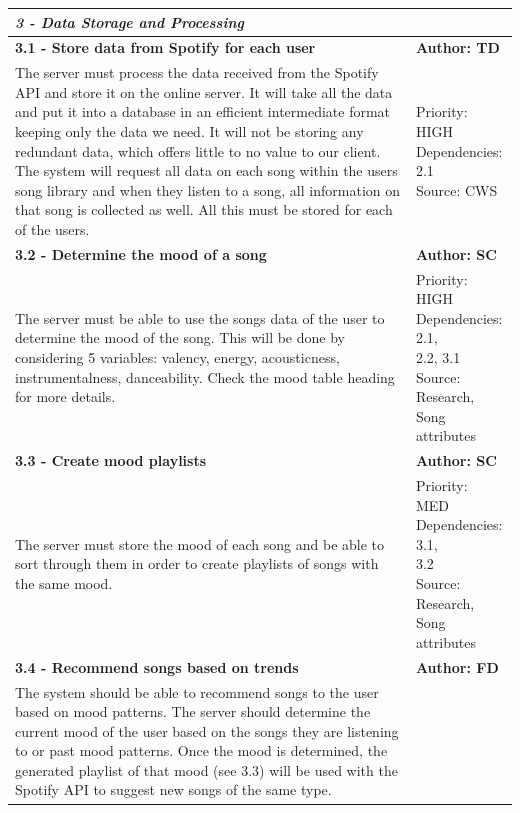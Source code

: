 \documentclass[10pt]{report}
\begin{document}
\begin{center}
\begin{longtable}{| p{13cm} | p{3cm} |}
\multicolumn{2}{|l|}{\textbf{\textit{3 - Data Storage and Processing}}} \\
\hline
\textbf{3.1 - Store data from Spotify for each user} & \textbf{Author: TD} \\
\hline
The server must process the data received from the Spotify API and store it on the online server. It will take all the data and put it into a database in an efficient intermediate format keeping only the data we need. It will not be storing any redundant data, which offers little to no value to our client. The system will request all data on each song within the users song library and when they listen to a song, all information on that song is collected as well. All this must be stored for each of the users. &
\makecell{Priority: HIGH\\Dependencies: 2.1\\Source: CWS} \\
\hline
\textbf{3.2 - Determine the mood of a song} & \textbf{Author: SC} \\
\hline
The server must be able to use the songs data of the user to determine the mood of the song. This will be done by considering 5 variables: valency, energy, acousticness, instrumentalness, danceability. Check the mood table heading for more details. & 
\makecell{Priority: HIGH\\Dependencies: 2.1,\\2.2, 3.1\\Source: Research,\\ Song attributes}\\
\hline
\textbf{3.3 - Create mood playlists} & \textbf{Author: SC} \\
\hline
The server must store the mood of each song and be able to sort through them in order to create playlists of songs with the same mood. & 
\makecell{Priority: MED\\Dependencies: 3.1,\\3.2\\Source: Research,\\ Song attributes}\\
\hline
\textbf{3.4 - Recommend songs based on trends} & \textbf{Author: FD} \\
\hline
The system should be able to recommend songs to the user based on mood patterns. The server should determine the current mood of the user based on the songs they are listening to or past mood patterns. Once the mood is determined, the generated playlist of that mood (see 3.3) will be used with the Spotify API to suggest new songs of the same type. &  

\end{longtable}
\end{center}
\end{document}
